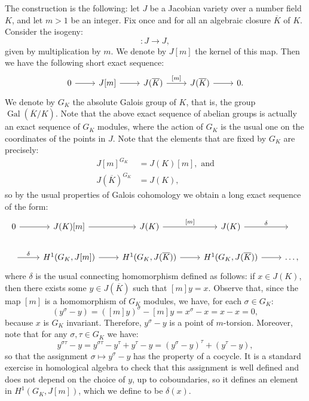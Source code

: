 \documentclass[a4paper, 12pt]{amsart}
\theoremstyle{definition}
\theoremstyle{plain}
\theoremstyle{plain}
\theoremstyle{plain}
\theoremstyle{plain}
\theoremstyle{remark}
\theoremstyle{remark}
\theoremstyle{plain}
\DeclareMathOperator{\Gal}{Gal}
\begin{document}
	The construction is the following: let $J$ be a Jacobian variety over a number field $K$, and let $m>1$ be an integer. Fix once and for all an algebraic closure $\overline{K}$ of $K$. Consider the isogeny:
	\begin{equation*}
		[m]:J\rightarrow J,
	\end{equation*}
	given by multiplication by $m$. We denote by $J[m]$ the kernel of this map. Then we have the following short exact sequence:
	\begin{equation}\label{kummersequence}
		\begin{tikzcd}
			0\arrow{r}
			&J[m]\arrow{r}
			&J(\overline{K})\arrow{r}{[m]}
			&J(\overline{K})\arrow{r}
			&0.
		\end{tikzcd}
	\end{equation}
	We denote by $G_K$ the absolute Galois group of $K$, that is, the group $\Gal(\overline{K}/K)$. Note that the above exact sequence of abelian groups is actually an exact sequence of $G_K$ modules, where the action of $G_K$ is the usual one on the coordinates of the points in $J$. Note that the elements that are fixed by $G_K$ are precisely:
	\begin{align*}
		J[m]^{G_K}&=J(K)[m],\text{ and}\\
		J(\overline{K})^{G_K}&=J(K),
	\end{align*}
	so by the usual properties of Galois cohomology we obtain a long exact sequence of the form:
	\begin{equation*}
		\begin{tikzcd}
			0\arrow{r}
			&J(K)[m]\arrow{r}
			&J(K)\arrow{r}{[m]}
			&J(K)\arrow{r}{\delta}
			&\phantom{ }
			\\ \arrow{r}{\delta}
			&H^1(G_K,J[m])\arrow{r}
			&H^1(G_K,J(\overline{K}))\arrow{r}
			&H^1(G_K,J(\overline{K}))\arrow{r}
			& \ldots,
		\end{tikzcd}
	\end{equation*}
	where $\delta$ is the usual connecting homomorphism defined as follows: if $x\in J(K)$, then there exists some $y\in J(\overline{K})$ such that $[m]y=x$. Observe that, since the map $[m]$ is a homomorphism of $G_K$ modules, we have, for each $\sigma\in G_K$:
	\begin{equation*}
		[m](y^\sigma-y)=([m]y)^\sigma -[m]y=x^\sigma -x=x-x=0,
	\end{equation*}
because $x$ is $G_K$ invariant. Therefore, $y^\sigma-y$ is a point of $m$-torsion. Moreover, note that for any $\sigma,\tau\in G_K$ we have:
\begin{equation*}
	y^{\sigma\tau}-y=y^{\sigma\tau}-y^\tau+y^\tau -y=(y^\sigma-y)^\tau + (y^\tau-y),
\end{equation*}
so that the assignment $\sigma\mapsto y^\sigma-y$ has the property of a cocycle. It is a standard exercise in homological algebra to check that this assignment is well defined and does not depend on the choice of $y$, up to coboundaries, so it defines an element in $H^1(G_K, J[m])$, which we define to be $\delta(x)$.
\end{document}
